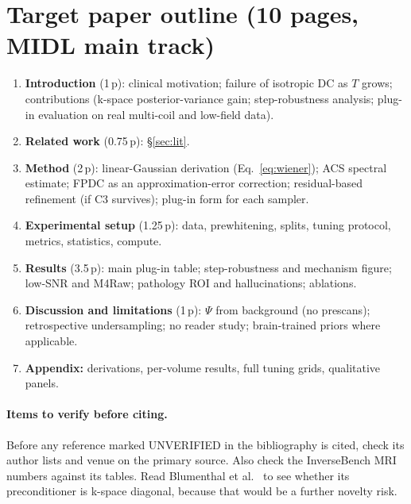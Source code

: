 \documentclass[10pt,a4paper]{article}
\begin{document}
\section{Target paper outline (10 pages, MIDL main track)}
\begin{enumerate}
  \item \textbf{Introduction} (1\,p): clinical motivation; failure of isotropic DC as
        $T$ grows; contributions (k-space posterior-variance gain; step-robustness
        analysis; plug-in evaluation on real multi-coil and low-field data).
  \item \textbf{Related work} (0.75\,p): \S\ref{sec:lit}.
  \item \textbf{Method} (2\,p): linear-Gaussian derivation (Eq.~\ref{eq:wiener}); ACS
        spectral estimate; FPDC as an approximation-error correction; residual-based
        refinement (if C3 survives); plug-in form for each sampler.
  \item \textbf{Experimental setup} (1.25\,p): data, prewhitening, splits, tuning
        protocol, metrics, statistics, compute.
  \item \textbf{Results} (3.5\,p): main plug-in table; step-robustness and mechanism
        figure; low-SNR and M4Raw; pathology ROI and hallucinations; ablations.
  \item \textbf{Discussion and limitations} (1\,p): $\Psi$ from background (no
        prescans); retrospective undersampling; no reader study; brain-trained priors
        where applicable.
  \item \textbf{Appendix:} derivations, per-volume results, full tuning grids,
        qualitative panels.
\end{enumerate}

\paragraph{Items to verify before citing.} Before any reference marked UNVERIFIED in the
bibliography is cited, check its author lists and venue on the primary source. Also
check the InverseBench MRI numbers against its tables. Read Blumenthal et al.\
\cite{blumenthal2025pula} to see whether its preconditioner is k-space diagonal, because
that would be a further novelty risk.



\end{document}
